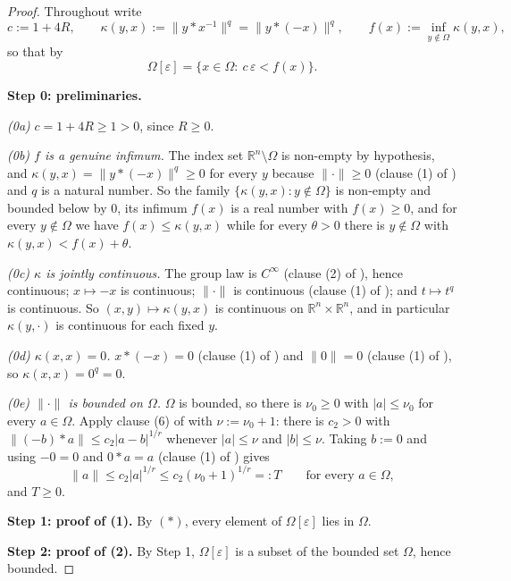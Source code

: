 \begin{proof}
Throughout write
\[
 c:=1+4R,\qquad
 \kappa(y,x):=\big\|y*x^{-1}\big\|^{q}=\big\|y*(-x)\big\|^{q},\qquad
 f(x):=\inf_{y\notin\Omega}\kappa(y,x),
\]
so that by 
\[
 \Omega[\varepsilon]=\{x\in\Omega:\ c\,\varepsilon<f(x)\}. \tag{$\ast$}
\]

\medskip\noindent\textbf{Step 0: preliminaries.}

\emph{(0a)} $c=1+4R\ge1>0$, since $R\ge0$.

\emph{(0b) $f$ is a genuine infimum.} The index set $\mathbb R^{n}\setminus\Omega$ is
non-empty by hypothesis, and $\kappa(y,x)=\|y*(-x)\|^{q}\ge0$ for every $y$ because
$\|\cdot\|\ge0$ (clause (1) of ) and $q$ is a natural number. So the
family $\{\kappa(y,x):y\notin\Omega\}$ is non-empty and bounded below by $0$, its infimum
$f(x)$ is a real number with $f(x)\ge0$, and for every $y\notin\Omega$ we have
$f(x)\le\kappa(y,x)$ while for every $\theta>0$ there is $y\notin\Omega$ with
$\kappa(y,x)<f(x)+\theta$.

\emph{(0c) $\kappa$ is jointly continuous.} The group law is $C^{\infty}$ (clause (2) of
), hence continuous; $x\mapsto-x$ is continuous; $\|\cdot\|$ is
continuous (clause (1) of ); and $t\mapsto t^{q}$ is continuous. So
$(x,y)\mapsto\kappa(y,x)$ is continuous on $\mathbb R^{n}\times\mathbb R^{n}$, and in
particular $\kappa(y,\cdot)$ is continuous for each fixed $y$.

\emph{(0d) $\kappa(x,x)=0$.} $x*(-x)=0$ (clause (1) of ) and
$\|0\|=0$ (clause (1) of ), so $\kappa(x,x)=0^{q}=0$.

\emph{(0e) $\|\cdot\|$ is bounded on $\Omega$.} $\Omega$ is bounded, so there is
$\nu_0\ge0$ with $|a|\le\nu_0$ for every $a\in\Omega$. Apply clause (6) of
 with $\nu:=\nu_0+1$: there is $c_2>0$ with
$\|(-b)*a\|\le c_2|a-b|^{1/r}$ whenever $|a|\le\nu$ and $|b|\le\nu$. Taking $b:=0$ and
using $-0=0$ and $0*a=a$ (clause (1) of ) gives
\[
 \|a\|\le c_2|a|^{1/r}\le c_2(\nu_0+1)^{1/r}=:T\qquad\text{for every }a\in\Omega, \tag{0e}
\]
and $T\ge0$.

\medskip\noindent\textbf{Step 1: proof of (1).} By $(\ast)$, every element of
$\Omega[\varepsilon]$ lies in $\Omega$.

\medskip\noindent\textbf{Step 2: proof of (2).} By Step 1, $\Omega[\varepsilon]$ is a
subset of the bounded set $\Omega$, hence bounded.


\end{proof}
